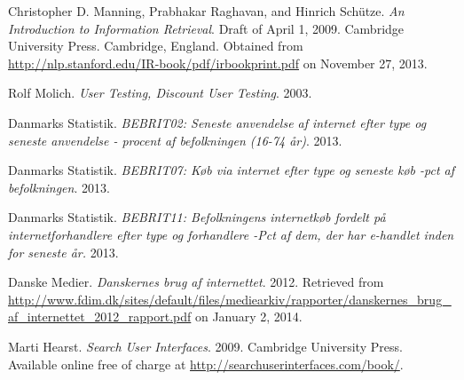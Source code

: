 \begin{thebibliography}{9} %


Christopher D. Manning, Prabhakar Raghavan, and Hinrich Sch\"utze. \emph{An
Introduction to Information Retrieval}. Draft of April 1, 2009. Cambridge
University Press. Cambridge, England.  Obtained from
\url{http://nlp.stanford.edu/IR-book/pdf/irbookprint.pdf} on November 27, 2013.


Rolf Molich. \emph{User Testing, Discount User Testing}. 2003.


Danmarks Statistik. \emph{BEBRIT02: Seneste anvendelse af internet efter type
og seneste anvendelse - procent af befolkningen (16-74 år)}. 2013.


Danmarks Statistik. \emph{BEBRIT07: Køb via internet efter type og seneste køb
-pct af befolkningen}. 2013.


Danmarks Statistik. \emph{BEBRIT11: Befolkningens internetkøb fordelt på
internetforhandlere efter type og forhandlere -Pct af dem, der har e-handlet
inden for seneste år.} 2013.


Danske Medier. \emph{Danskernes brug af internettet}. 2012. Retrieved from
\url{http://www.fdim.dk/sites/default/files/mediearkiv/rapporter/danskernes_brug_af_internettet_2012_rapport.pdf}
on January 2, 2014.


Marti Hearst. \emph{Search User Interfaces}. 2009. Cambridge University Press.
Available online free of charge at \url{http://searchuserinterfaces.com/book/}.

\end{thebibliography}

